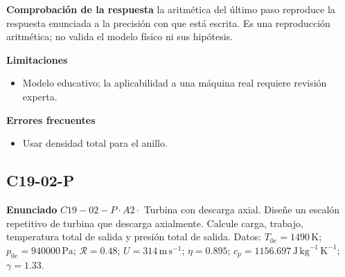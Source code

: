 \documentclass[10pt,openany]{book}
\begin{document}
\noindent\textbf{Comprobación de la respuesta} la aritmética del último paso reproduce la respuesta enunciada a la precisión con que está escrita. Es una reproducción aritmética; no valida el modelo físico ni sus hipótesis.

\noindent\textbf{Limitaciones}
\begin{itemize}
\item Modelo educativo; la aplicabilidad a una máquina real requiere revisión experta.
\end{itemize}

\noindent\textbf{Errores frecuentes}
\begin{itemize}
\item Usar densidad total para el anillo.
\end{itemize}
\begin{center}\end{center}
\subsection*{C19-02-P}

\noindent\textbf{Enunciado}
\(C19-02-P \cdot A2 \cdot\) Turbina con descarga axial. Diseñe un escalón repetitivo de turbina que descarga axialmente. Calcule carga, trabajo, temperatura total de salida y presión total de salida. Datos: \(T_{0e}=1490\, \mathrm{K}\); \(p_{0e}=940000\, \mathrm{Pa}\); \(\mathcal R=0.48\); \(U=314\, \mathrm{m}\,\mathrm{s}^{-1}\); \(\eta=0.895\); \(c_p=1156.697\, \mathrm{J}\,\mathrm{kg}^{-1}\,\mathrm{K}^{-1}\); \(\gamma=1.33\).
\end{document}
